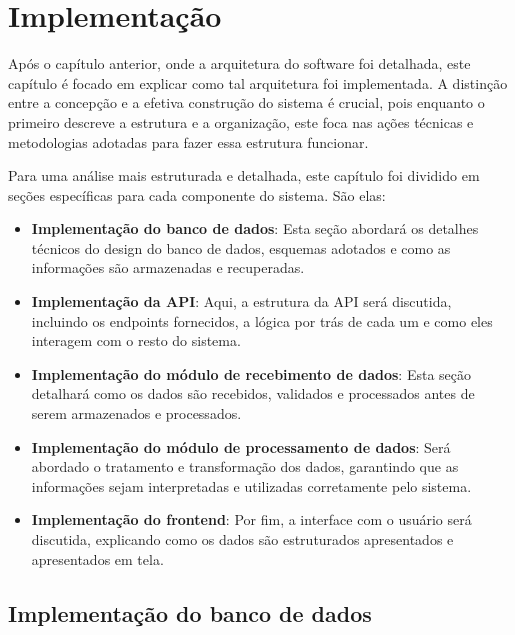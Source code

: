 \chapter{Implementação}\label{cap:implementation}

Após o capítulo anterior, onde a arquitetura do software foi detalhada, este capítulo é focado em explicar como tal arquitetura foi implementada. A distinção entre a concepção e a efetiva construção do sistema é crucial, pois enquanto o primeiro descreve a estrutura e a organização, este foca nas ações técnicas e metodologias adotadas para fazer essa estrutura funcionar.

Para uma análise mais estruturada e detalhada, este capítulo foi dividido em seções específicas para cada componente do sistema. São elas:

\begin{itemize}
    \item \textbf{Implementação do banco de dados}: Esta seção abordará os detalhes técnicos do design do banco de dados, esquemas adotados e como as informações são armazenadas e recuperadas.
    
    \item \textbf{Implementação da API}: Aqui, a estrutura da API será discutida, incluindo os endpoints fornecidos, a lógica por trás de cada um e como eles interagem com o resto do sistema.
    
    \item \textbf{Implementação do módulo de recebimento de dados}: Esta seção detalhará como os dados são recebidos, validados e processados antes de serem armazenados e processados.
    
    \item \textbf{Implementação do módulo de processamento de dados}: Será abordado o tratamento e transformação dos dados, garantindo que as informações sejam interpretadas e utilizadas corretamente pelo sistema.
    
    \item \textbf{Implementação do frontend}: Por fim, a interface com o usuário será discutida, explicando como os dados são estruturados apresentados e apresentados em tela.
\end{itemize}




\section[Implementação do banco de dados]{Implementação do banco de dados}


